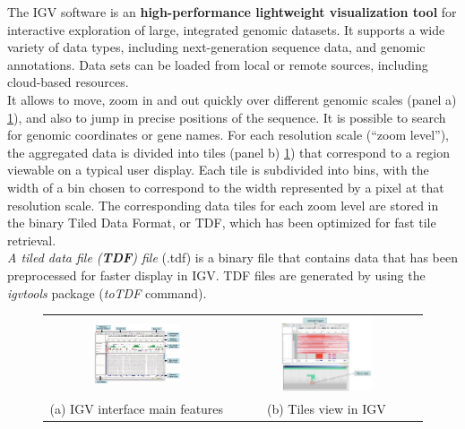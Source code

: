The IGV software is an \textbf{high-performance lightweight visualization tool} for interactive exploration of large, integrated genomic datasets. It supports a wide variety of data types, including next-generation sequence data, and genomic annotations. Data sets can be loaded from local or remote sources, including cloud-based resources.
\\
It allows to move, zoom in and out quickly over different genomic scales
(panel a) \ref{fig:IGV_navigation}), and also to jump in precise positions
of the sequence. It is possible to search for genomic coordinates or gene names.
For each resolution scale (“zoom level”), the aggregated data is divided into
tiles (panel b) \ref{fig:IGV_navigation}) that correspond to a region viewable on a
typical user display. Each tile is subdivided into bins, with the width of a bin
chosen to correspond to the width represented by a pixel at that resolution
scale. The corresponding data tiles for each zoom level are stored in the binary
Tiled Data Format, or TDF, which has been optimized for fast tile retrieval.\\ 
\textit{A tiled data file (\textbf{TDF}) file} (.tdf) is a binary file that
contains data that has been preprocessed for faster display in IGV. TDF files
are generated by using the \textit{igvtools} package (\textit{toTDF} command).\\

\begin{figure}[H]
\begin{tabular}{cc}
  \includegraphics[width=0.5\textwidth]{IGVview.PNG} &   \includegraphics[width=0.5\textwidth]{TileView.PNG} \\
(a) IGV interface main features & (b) Tiles view in IGV \\[6pt]
\end{tabular}
\caption{}
\label{fig:IGV_navigation}
\end{figure}



